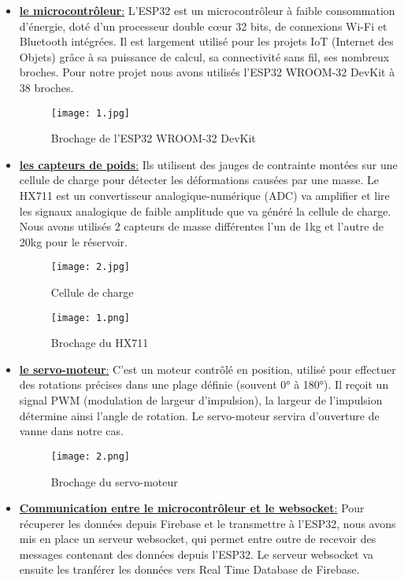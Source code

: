 \begin{itemize}
\item \underline{\textbf{le microcontrôleur}:} L’ESP32 est un microcontrôleur à faible consommation d’énergie, doté d’un processeur double cœur 32 bits, de connexions Wi-Fi et Bluetooth intégrées. Il est largement utilisé pour les projets IoT (Internet des Objets) grâce à sa puissance de calcul, sa connectivité sans fil, ses nombreux broches. Pour notre projet nous avons utilisés l'ESP32 WROOM-32 DevKit à 38 broches.\\


\begin{figure}[H]
	\centering
	\texttt{[image: 1.jpg]}
	\caption{Brochage de l'ESP32 WROOM-32 DevKit}
\end{figure}

\item \underline{\textbf{les capteurs de poids}:} Ils utilisent des jauges de contrainte montées sur une cellule de charge pour détecter les déformations causées par une masse. Le HX711 est un convertisseur analogique-numérique (ADC) va amplifier et lire les signaux analogique de faible amplitude que va généré la cellule de charge. Nous avons utilisés 2 capteurs de masse différentes l'un de 1kg et l'autre de 20kg pour le réservoir.

\begin{figure}[H]
	\centering
	\texttt{[image: 2.jpg]}
	\caption{Cellule de charge}
\end{figure}

\begin{figure}[H]
	\centering
	\texttt{[image: 1.png]}
	\caption{Brochage du HX711}
\end{figure}

\item \underline{\textbf{le servo-moteur}:} C'est un moteur contrôlé en position, utilisé pour effectuer des rotations précises dans une plage définie (souvent 0° à 180°). Il reçoit un signal PWM (modulation de largeur d’impulsion), la largeur de l’impulsion détermine ainsi l’angle de rotation. Le servo-moteur servira d'ouverture de vanne dans notre cas.

\begin{figure}[H]
	\centering
	\texttt{[image: 2.png]}
	\caption{Brochage du servo-moteur}
\end{figure}

\item  \underline{\textbf{Communication entre le microcontrôleur et le websocket}:} Pour récuperer les données depuis Firebase et le transmettre à l'ESP32, nous avons mis en place un serveur websocket, qui permet entre outre de recevoir des messages contenant des données depuis l'ESP32.  Le serveur websocket va ensuite les tranférer les données  vers  Real Time Database de Firebase.

\end{itemize}


